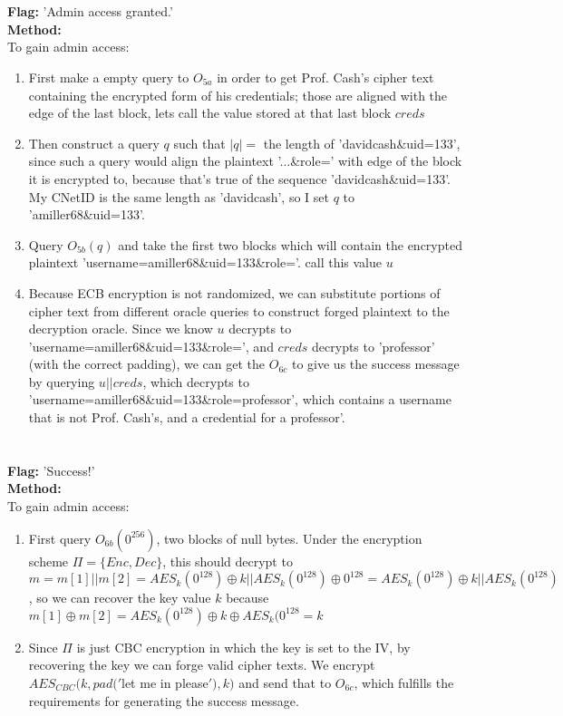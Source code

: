 \documentclass[]{article}
\begin{document}
\section{}
\textbf{Flag:} 'Admin access granted.'
\\
\textbf{Method:}
\\
To gain admin access:
\begin{enumerate}
	\item First make a empty query to $O_{5a}$ in order to get Prof. Cash's cipher text containing the encrypted form of his credentials; those are aligned with the edge of the last block, lets call the value stored at that last block $creds$
	\item Then construct a query $q$ such that $|q| = $ the length of 'davidcash\&uid=133', since such a query would align the plaintext '...\&role=' with edge of the block it is encrypted to, because that's true of the sequence 'davidcash\&uid=133'. My CNetID is the same length as 'davidcash', so I set $q$ to 'amiller68\&uid=133'. 
	\item Query $O_{5b}(q)$ and take the first two blocks which will contain the encrypted plaintext 
	'username=amiller68\&uid=133\&role='. call this value $u$
	\item Because ECB encryption is not randomized, we can substitute portions of cipher text from different oracle queries to construct forged plaintext to the decryption oracle. Since we know $u$ decrypts to 'username=amiller68\&uid=133\&role=', and $creds$ decrypts to 'professor' (with the correct padding), we can get the $O_{6c}$ to give us the success message by querying $u || creds$, which decrypts to 'username=amiller68\&uid=133\&role=professor', which contains a username that is not Prof. Cash's, and a credential for a professor'.
\end{enumerate}

\section{}
\textbf{Flag:} 'Success!'
\\
\textbf{Method:}
\\
To gain admin access:
\begin{enumerate}
	\item First query $O_{6b}(0^{256})$, two blocks of null bytes. Under the encryption scheme $\Pi = \{Enc, Dec\}$, this should decrypt to $m = m[1] || m[2] = AES_k(0^{128}) \oplus k || AES_k(0^{128}) \oplus 0^{128} = AES_k(0^{128}) \oplus k || AES_k(0^{128})$, so we can recover the key value $k$ because $m[1] \oplus m[2] = AES_k(0^{128}) \oplus k \oplus AES_k(0^{128}  = k$
	\item Since $\Pi$ is just CBC encryption in which the key is set to the IV, by recovering the key we can forge valid cipher texts. We encrypt $AES_{CBC}(k, pad('$let me in please$'), k)$ and send that to $O_{6c}$, which fulfills the requirements for generating the success message.
\end{enumerate}
\end{document}
